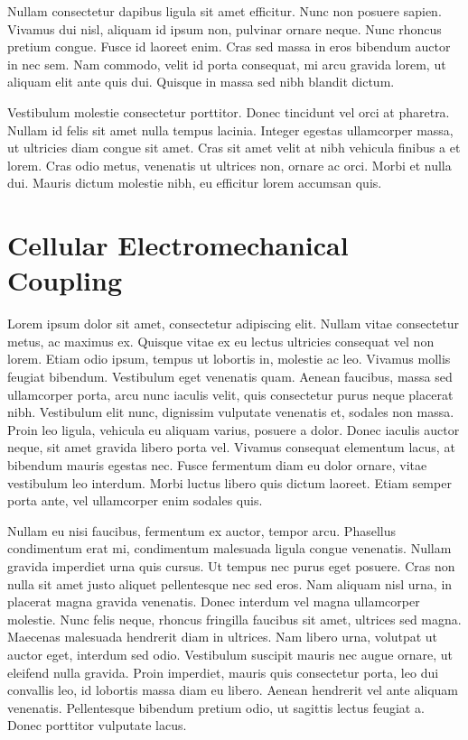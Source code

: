 Nullam consectetur dapibus ligula sit amet efficitur. Nunc non posuere sapien. Vivamus dui nisl, aliquam id ipsum non, pulvinar ornare neque. Nunc rhoncus pretium congue. Fusce id laoreet enim. Cras sed massa in eros bibendum auctor in nec sem. Nam commodo, velit id porta consequat, mi arcu gravida lorem, ut aliquam elit ante quis dui. Quisque in massa sed nibh blandit dictum.

Vestibulum molestie consectetur porttitor. Donec tincidunt vel orci at pharetra. Nullam id felis sit amet nulla tempus lacinia. Integer egestas ullamcorper massa, ut ultricies diam congue sit amet. Cras sit amet velit at nibh vehicula finibus a et lorem. Cras odio metus, venenatis ut ultrices non, ornare ac orci. Morbi et nulla dui. Mauris dictum molestie nibh, eu efficitur lorem accumsan quis.

\section{Cellular Electromechanical Coupling}
\label{sec:electromech}

Lorem ipsum dolor sit amet, consectetur adipiscing elit. Nullam vitae consectetur metus, ac maximus ex. Quisque vitae ex eu lectus ultricies consequat vel non lorem. Etiam odio ipsum, tempus ut lobortis in, molestie ac leo. Vivamus mollis feugiat bibendum. Vestibulum eget venenatis quam. Aenean faucibus, massa sed ullamcorper porta, arcu nunc iaculis velit, quis consectetur purus neque placerat nibh. Vestibulum elit nunc, dignissim vulputate venenatis et, sodales non massa. Proin leo ligula, vehicula eu aliquam varius, posuere a dolor. Donec iaculis auctor neque, sit amet gravida libero porta vel. Vivamus consequat elementum lacus, at bibendum mauris egestas nec. Fusce fermentum diam eu dolor ornare, vitae vestibulum leo interdum. Morbi luctus libero quis dictum laoreet. Etiam semper porta ante, vel ullamcorper enim sodales quis.

Nullam eu nisi faucibus, fermentum ex auctor, tempor arcu. Phasellus condimentum erat mi, condimentum malesuada ligula congue venenatis. Nullam gravida imperdiet urna quis cursus. Ut tempus nec purus eget posuere. Cras non nulla sit amet justo aliquet pellentesque nec sed eros. Nam aliquam nisl urna, in placerat magna gravida venenatis. Donec interdum vel magna ullamcorper molestie. Nunc felis neque, rhoncus fringilla faucibus sit amet, ultrices sed magna. Maecenas malesuada hendrerit diam in ultrices. Nam libero urna, volutpat ut auctor eget, interdum sed odio. Vestibulum suscipit mauris nec augue ornare, ut eleifend nulla gravida. Proin imperdiet, mauris quis consectetur porta, leo dui convallis leo, id lobortis massa diam eu libero. Aenean hendrerit vel ante aliquam venenatis. Pellentesque bibendum pretium odio, ut sagittis lectus feugiat a. Donec porttitor vulputate lacus.

